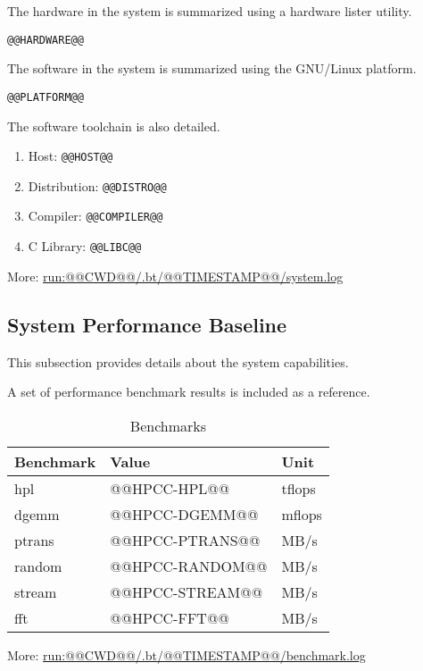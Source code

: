 \documentclass[a4paper]{article}
\begin{document}
The hardware in the system is summarized using a hardware lister utility.

\begin{verbatim}
@@HARDWARE@@
\end{verbatim}

The software in the system is summarized using the GNU/Linux platform.

\begin{verbatim}
@@PLATFORM@@
\end{verbatim}

The software toolchain is also detailed.

\begin{enumerate}
\item Host: {\tt @@HOST@@}
\item Distribution: {\tt @@DISTRO@@}
\item Compiler: {\tt @@COMPILER@@}
\item C Library: {\tt @@LIBC@@}
\end{enumerate}

More: \url{run:@@CWD@@/.bt/@@TIMESTAMP@@/system.log}

\subsection{System Performance Baseline}

This subsection provides details about the system capabilities.

A set of performance benchmark results is included as a reference.

\begin{table}[H]
\caption{Benchmarks}
  \centering
    \begin{tabular}{|l|l|l|}\hline
      {\bf Benchmark} & {\bf Value} & {\bf Unit} \\ \hline
      hpl & @@HPCC-HPL@@ & tflops \\ \hline
      dgemm & @@HPCC-DGEMM@@ & mflops \\ \hline
      ptrans & @@HPCC-PTRANS@@ & MB/s \\ \hline
      random & @@HPCC-RANDOM@@ & MB/s \\ \hline
      stream & @@HPCC-STREAM@@ & MB/s \\ \hline
      fft & @@HPCC-FFT@@ & MB/s \\ \hline
    \end{tabular}
 \label{table:pruebas}
\end{table}

More: \url{run:@@CWD@@/.bt/@@TIMESTAMP@@/benchmark.log}
\end{document}
